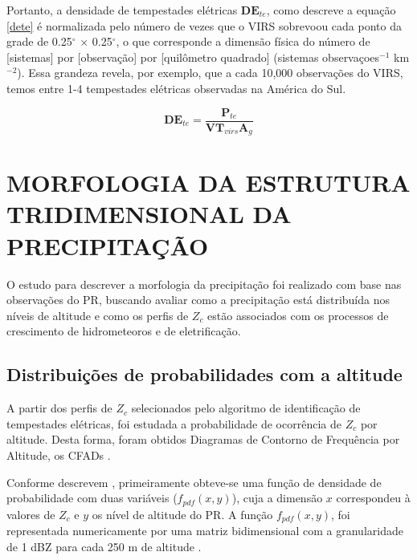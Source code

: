 Portanto, a densidade de tempestades elétricas $\mathbf{DE}_{te}$, como descreve a equação \ref{dete} é normalizada pelo número de vezes que o VIRS sobrevoou cada ponto da grade de 0.25$^{\circ}$  $\times$ 0.25$^{\circ}$, o que corresponde a dimensão física do número de [sistemas] por [observação] por [quilômetro quadrado] (sistemas observaçoes$^{-1}$ km$^{-2}$). Essa grandeza revela, por exemplo, que a cada 10,000 observações do VIRS, temos entre 1-4 tempestades elétricas observadas na América do Sul.

\begin{equation}
\mathbf{DE}_{te} = \frac{\mathbf{P}_{te}}{\mathbf{VT}_{virs} \mathbf{A}_g}    
\label{dete}
\end{equation}

\section{MORFOLOGIA DA ESTRUTURA TRIDIMENSIONAL DA PRECIPITAÇÃO}

O estudo para descrever a morfologia da precipitação foi realizado com base nas observações do PR, buscando avaliar como a precipitação está distribuída nos níveis de altitude e como os perfis de $Z_c$ estão associados com os processos de crescimento de hidrometeoros e de eletrificação.  



\subsection{Distribuições de probabilidades com a altitude}

A partir dos perfis de $Z_c$ selecionados pelo algoritmo de identificação de tempestades elétricas, foi estudada a probabilidade de ocorrência de $Z_c$ por altitude. Desta forma, foram obtidos Diagramas de Contorno de Frequência por Altitude, os CFADs \cite{yuter1995}.

Conforme descrevem , primeiramente obteve-se uma função de densidade de probabilidade com duas variáveis ($f_{pdf}(x,y)$), cuja a dimensão $x$ correspondeu à valores de $Z_{c}$ e $y$ os nível de altitude do PR. A função $f_{pdf}(x,y)$, foi representada numericamente por uma matriz bidimensional com a granularidade de 1 dBZ para cada 250 m de altitude \cite{yuter1995}.



